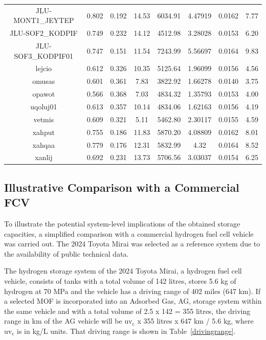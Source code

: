 \documentclass[review]{elsarticle}
\newcommand{\uvc}{\mathrm{uv_c}}
\begin{document}
{\begin{table}[H]
\begin{center}
\begin{tabular}{cccccccc}
JLU-MONT1\_JEYTEP &  0.802 &  0.192  &  14.53  & 6034.91 & 4.47919 & 0.0162 & 7.77 \\
JLU-SOF2\_KODPIF  &  0.749 &  0.232  &  14.12  & 4512.98 & 3.28028 & 0.0153 & 6.20 \\
JLU-SOF3\_KODPIF01 &  0.747 &  0.151  &  11.54  & 7243.99 & 5.56697 & 0.0164 & 9.83 \\
lejcio            &  0.612 &  0.326  &  10.35  & 5125.64 & 1.96099 & 0.0156 & 4.56 \\
omusas            &  0.601 &  0.361  &   7.83  & 3822.92 & 1.66278 & 0.0140 & 3.75 \\
opawot            &  0.566 &  0.368  &   7.03  & 4834.32 & 1.35793 & 0.0153 & 4.00 \\
uqoluj01          &  0.613 &  0.357  &  10.14  & 4834.06 & 1.62163 & 0.0156 & 4.19 \\
vetmis            &  0.609 &  0.321  &   5.11  & 5462.80 & 2.30117 & 0.0155 & 4.59 \\
xahput            &  0.755 &  0.186  &  11.83  & 5870.20 & 4.08809 & 0.0162 & 8.01 \\
xahqaa            &  0.779 &  0.176  &  12.31  & 5832.99 & 4.32    & 0.0164 & 8.52 \\
xanlij            &  0.692 &  0.231  &  13.73  & 5706.56 & 3.03037 & 0.0154 & 6.25 \\
\hline
\end{tabular}
\end{center}
\end{table}

\subsection{Illustrative Comparison with a Commercial FCV}

To illustrate the potential system-level implications of the obtained storage capacities, a simplified comparison with a commercial hydrogen fuel cell vehicle was carried out.
The 2024 Toyota Mirai was selected as a reference system due to the availability of public technical data.

The hydrogen storage system of the 2024 Toyota Mirai, a hydrogen fuel cell vehicle, consists of tanks with a total volume of 142 litres, stores 5.6 kg of hydrogen at 70 MPa and the vehicle has a driving range of 402 miles (647 km). If a selected MOF is incorporated into an Adsorbed Gas, AG, storage system within the same vehicle and with a total volume of 2.5 x 142 = 355 litres, the driving range in km of the 
AG vehicle will be $\uvc$ x 355 litres x 647 km / 5.6 kg, where $\uvc$ is in kg/L units. That 
driving range is shown in Table~\ref{drivingrange}.

}
\end{document}
